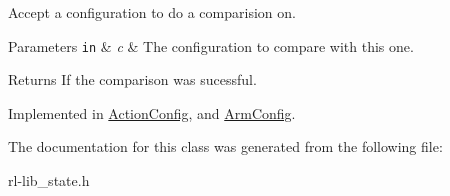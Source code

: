 Accept a configuration to do a comparision on. 


\begin{DoxyParams}[1]{Parameters}
\mbox{\tt in}  & {\em c} & The configuration to compare with this one. \\
\hline
\end{DoxyParams}
\begin{DoxyReturn}{Returns}
If the comparison was sucessful. 
\end{DoxyReturn}


Implemented in \hyperlink{classActionConfig_a822bda3a3ae83a30d6e7d297ca80c451}{Action\-Config}, and \hyperlink{classArmConfig_a9c88c588472e0c18024d4a6c30f1f531}{Arm\-Config}.



The documentation for this class was generated from the following file\-:\begin{DoxyCompactItemize}
\item 
rl-\/lib\-\_\-state.\-h\end{DoxyCompactItemize}

